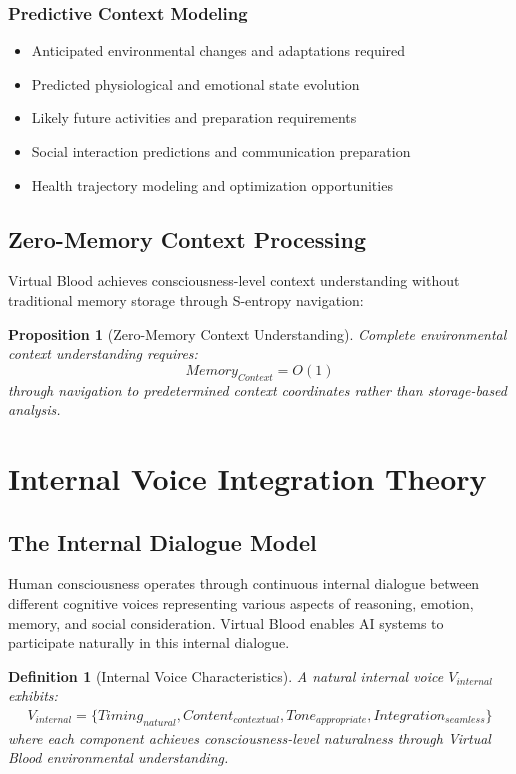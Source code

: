 \documentclass[12pt,a4paper]{article}
\newtheorem{definition}{Definition}
\newtheorem{proposition}{Proposition}
\begin{document}
\subsubsection{Predictive Context Modeling}
\begin{itemize}
\item Anticipated environmental changes and adaptations required
\item Predicted physiological and emotional state evolution
\item Likely future activities and preparation requirements
\item Social interaction predictions and communication preparation
\item Health trajectory modeling and optimization opportunities
\end{itemize}

\subsection{Zero-Memory Context Processing}

Virtual Blood achieves consciousness-level context understanding without traditional memory storage through S-entropy navigation:

\begin{proposition}[Zero-Memory Context Understanding]
Complete environmental context understanding requires:
\begin{equation}
Memory_{Context} = O(1)
\end{equation}
through navigation to predetermined context coordinates rather than storage-based analysis.
\end{proposition}

\section{Internal Voice Integration Theory}

\subsection{The Internal Dialogue Model}

Human consciousness operates through continuous internal dialogue between different cognitive voices representing various aspects of reasoning, emotion, memory, and social consideration. Virtual Blood enables AI systems to participate naturally in this internal dialogue.

\begin{definition}[Internal Voice Characteristics]
A natural internal voice $V_{internal}$ exhibits:
\begin{align}
V_{internal} = \{Timing_{natural}, Content_{contextual}, Tone_{appropriate}, Integration_{seamless}\}
\end{align}
where each component achieves consciousness-level naturalness through Virtual Blood environmental understanding.
\end{definition}
\end{document}
